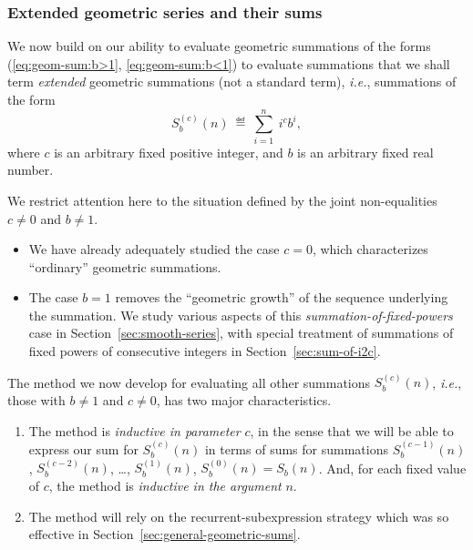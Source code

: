 \subsubsection{Extended geometric series and their sums}
\label{sec:extended-geom-series}

We now build on our ability to evaluate geometric summations of the
forms (\ref{eq:geom-sum:b>1}, \ref{eq:geom-sum:b<1}) to evaluate
summations that we shall term {\em extended} geometric summations (not
a standard term), \textit{i.e.}, summations of the form
\[ S_b^{(c)}(n) \ \eqdef \ \sum_{i=1}^n \ i^c b^i, \]
where $c$ is an arbitrary fixed positive integer, and $b$ is an
arbitrary fixed real number.

We restrict attention here to the situation defined by the joint
non-equalities $c \neq 0$ and $b \neq 1$.
\begin{itemize}
\item
We have already adequately studied the case $c=0$, which characterizes
``ordinary'' geometric summations.
\item
The case $b = 1$ removes the ``geometric growth'' of the sequence
underlying the summation.  We study various aspects of this {\it
  summation-of-fixed-powers} case in Section~\ref{sec:smooth-series},
with special treatment of summations of fixed powers of consecutive
integers in Section~\ref{sec:sum-of-i2c}.
\end{itemize}

The method we now develop for evaluating all other summations
$S_b^{(c)}(n)$, \textit{i.e.}, those with $b \neq 1$ and $c \neq 0$, has two
major characteristics.
\begin{enumerate}
\item
The method is {\em inductive in parameter} $c$, in the sense that we
will be able to express our sum for $S_b^{(c)}(n)$ in terms of sums
for summations $S_b^{(c-1)}(n)$, $S_b^{(c-2)}(n)$, \ldots,
$S_b^{(1)}(n)$, $S_b^{(0)}(n) = S_b(n)$.  And, for each fixed value of
$c$, the method is {\em inductive in the argument} $n$.


\item
The method will rely on the recurrent-subexpression strategy which was so
effective in Section~\ref{sec:general-geometric-sums}.
\end{enumerate}

